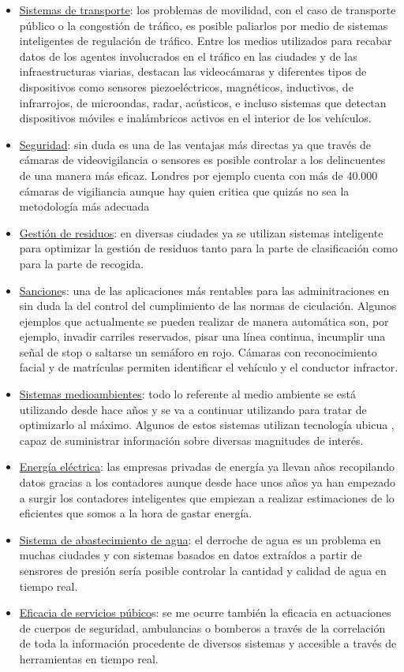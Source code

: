  \begin{itemize}
 	\item \underline{Sistemas de transporte}: los problemas de movilidad, con el caso de transporte público o la congestión de tráfico, es posible paliarlos por medio de sistemas inteligentes de regulación de tráfico. Entre los medios utilizados para recabar datos de los agentes involucrados en el tráfico en las ciudades y de las infraestructuras viarias, destacan las videocámaras y diferentes tipos de dispositivos como sensores piezoeléctricos, magnéticos, inductivos, de infrarrojos, de microondas, radar, acústicos, e incluso sistemas que detectan dispositivos móviles e inalámbricos activos en el interior de los vehículos.
 	\item \underline{Seguridad}: sin duda es una de las ventajas más directas ya que través de cámaras de videovigilancia o sensores es posible controlar a los delincuentes de una manera más eficaz. Londres por ejemplo cuenta con más de 40.000 cámaras de vigiliancia aunque hay quien critica que quizás no sea la metodología más adecuada \cite{london_cameras}
 	\item \underline{Gestión de residuos}: en diversas ciudades ya se utilizan sistemas inteligente para optimizar la gestión de residuos tanto para la parte de clasificación como para la parte de recogida. \cite{big_data_ciudades_inteligentes}
 	\item \underline{Sancione}s: una de las aplicaciones más rentables para las adminitraciones en sin duda la del control del cumplimiento de las normas de ciculación. Algunos ejemplos que actualmente se pueden realizar de manera automática son, por ejemplo, invadir carriles reservados, pisar una línea continua, incumplir una señal de stop o saltarse un semáforo en rojo. Cámaras con reconocimiento facial y de matrículas permiten identificar el vehículo y el conductor infractor.
 	\item \underline{Sistemas medioambientes}: todo lo referente al medio ambiente se está utilizando desde hace años y se va a continuar utilizando para tratar de optimizarlo al máximo. Algunos de estos sistemas utilizan tecnología ubicua \cite{tec_ubicua}, capaz de suministrar información sobre diversas magnitudes de interés.
 	\item \underline{Energía eléctrica}: las empresas privadas de energía ya llevan años recopilando datos gracias a los contadores aunque desde hace unos años ya han empezado a surgir los contadores inteligentes que empiezan a realizar estimaciones de lo eficientes que somos a la hora de gastar energía.
 	\item \underline{Sistema de abastecimiento de agua}: el derroche de agua es un problema en muchas ciudades y con sistemas basados en datos extraídos a partir de sensrores de presión sería posible controlar la cantidad y calidad de agua en tiempo real.
 	\item \underline{Eficacia de servicios púbico}s: se me ocurre también la eficacia en actuaciones de cuerpos de seguridad, ambulancias o bomberos a través de la correlación de toda la información procedente de diversos sistemas y accesible a través de herramientas en tiempo real.
 \end{itemize}
 
